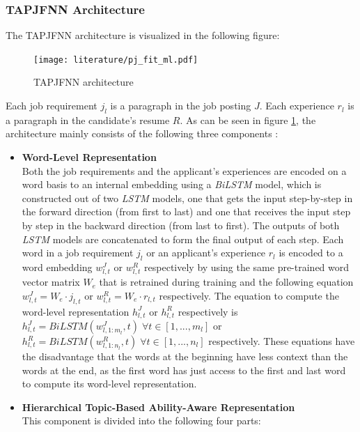 \documentclass[draft,final]{thesisclass} %
\begin{document}
\subsubsection{\gls{TAPJFNN} Architecture}
The \gls{TAPJFNN} architecture is visualized in the following figure:
\begin{figure}[H]
    \centering
    \texttt{[image: literature/pj\_fit\_ml.pdf]}
    \caption{\gls{TAPJFNN} architecture \parencite[8]{pj_fit_ml}}
    \label{fig:tapjfnn_architecture}
\end{figure}
Each job requirement $j_l$ is a paragraph in the job posting $J$.
Each experience $r_l$ is a paragraph in the candidate's resume $R$.
As can be seen in figure \ref{fig:tapjfnn_architecture}, the architecture mainly consists of the following three components \parencite[8-14]{pj_fit_ml}:
\begin{itemize}
    \item \textbf{Word-Level Representation}\\
        Both the job requirements and the applicant's experiences are encoded on a word basis to an internal embedding using a \textit{BiLSTM} model, which is constructed out of two \textit{LSTM} models, one that gets the input step-by-step in the forward direction (from first to last) and one that receives the input step by step in the backward direction (from last to first).
        The outputs of both \textit{LSTM} models are concatenated to form the final output of each step.
        Each word in a job requirement $j_l$ or an applicant's experience $r_l$ is encoded to a word embedding $w^J_{l,t}$ or $w^R_{l,t}$ respectively by using the same pre-trained word vector matrix $W_e$ that is retrained during training and the following equation $w^J_{l,t} = W_e \cdot j_{l,t}$ or $w^R_{l,t} = W_e \cdot r_{l,t}$ respectively.
        The equation to compute the word-level representation $h^J_{l,t}$ or $h^R_{l,t}$ respectively is $h^J_{l,t} = BiLSTM(w^J_{l,1:m_l},t) \; \forall t \in [1,...,m_l]$ or $h^R_{l,t} = BiLSTM(w^R_{l,1:n_l},t) \; \forall t \in [1,...,n_l]$ respectively.
        These equations have the disadvantage that the words at the beginning have less context than the words at the end, as the first word has just access to the first and last word to compute its word-level representation.
    \item \textbf{Hierarchical Topic-Based Ability-Aware Representation}\\
    This component is divided into the following four parts:
    \begin{itemize}

\end{itemize}
\end{itemize}
\end{document}
